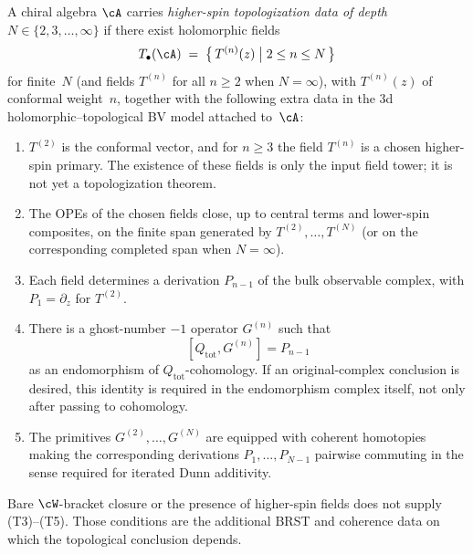 \begin{definition}
\label{def:higher-spin-stress-tower}
%
%
A chiral algebra $\cA$ carries \emph{higher-spin
topologization data of depth} $N \in \{2,3,\ldots,\infty\}$
if there exist holomorphic fields
\[
 T_\bullet(\cA) \;=\; \bigl\{\,T^{(n)}(z)
 \;\big|\; 2 \le n \le N\,\bigr\}
\]
for finite~$N$ \textup{(}and fields $T^{(n)}$ for all
$n\geq2$ when $N=\infty$\textup{)}, with $T^{(n)}(z)$ of
conformal weight~$n$, together with the following extra data
in the $3$d holomorphic--topological BV model attached to~$\cA$:
\begin{enumerate}[label=\textup{(T\arabic*)}]
\item $T^{(2)}$ is the conformal vector, and for $n\geq3$
 the field $T^{(n)}$ is a chosen higher-spin primary. The
 existence of these fields is only the input field tower; it
 is not yet a topologization theorem.
\item The OPEs of the chosen fields close, up to central
 terms and lower-spin composites, on the finite span
 generated by $T^{(2)},\ldots,T^{(N)}$ \textup{(}or on the
 corresponding completed span when $N=\infty$\textup{)}.
\item Each field determines a derivation
 $P_{n-1}$ of the bulk observable complex, with
 $P_1=\partial_z$ for $T^{(2)}$.
\item There is a ghost-number $-1$ operator $G^{(n)}$ such that
 \[
 [Q_{\mathrm{tot}},G^{(n)}]=P_{n-1}
 \]
 as an endomorphism of $Q_{\mathrm{tot}}$-cohomology. If an
 original-complex conclusion is desired, this identity is
 required in the endomorphism complex itself, not only after
 passing to cohomology.
\item The primitives $G^{(2)},\ldots,G^{(N)}$ are equipped with
 coherent homotopies making the corresponding derivations
 $P_1,\ldots,P_{N-1}$ pairwise commuting in the sense required
 for iterated Dunn additivity.
\end{enumerate}
Bare $\cW$-bracket closure or the presence of higher-spin
fields does not supply (T3)--(T5). Those conditions are the
additional BRST and coherence data on which the topological
conclusion depends.
\end{definition}

